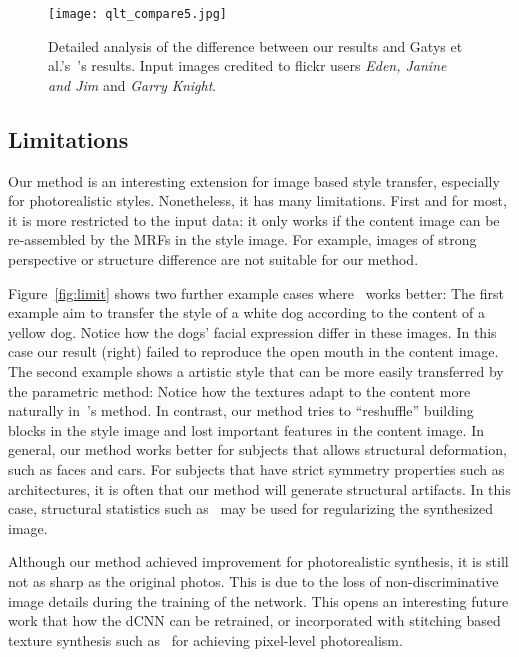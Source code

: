 \documentclass[10pt,twocolumn,letterpaper]{article}
\begin{document}
\begin{figure*}[ht]
	\centering
	\texttt{[image: qlt\_compare5.jpg]}
	\caption{Detailed analysis of the difference between our results and Gatys et al.'s~\cite{Gatys15}'s results. Input images credited to flickr users \emph{Eden, Janine and Jim} and \emph{Garry Knight}.}\label{fig:qlt_compare3}
\end{figure*}



\subsection{Limitations}
Our method is an interesting extension for image based style transfer, especially for photorealistic styles. Nonetheless, it has many limitations. First and for most, it is more restricted to the input data: it only works if the content image can be re-assembled by the MRFs in the style image. For example, images of strong perspective or structure difference are not suitable for our method. 

Figure~\ref{fig:limit} shows two further example cases where~\cite{Gatys15} works better: The first example aim to transfer the style of a white dog according to the content of a yellow dog. Notice how the dogs' facial expression differ in these images. In this case our result (right) failed to reproduce the open mouth in the content image. The second example shows a artistic style that can be more easily transferred by the parametric method: Notice how the textures adapt to the content more naturally in~\cite{Gatys15}'s method. In contrast, our method tries to ``reshuffle'' building blocks in the style image and lost important features in the content image. In general, our method works better for subjects that allows structural deformation, such as faces and cars. For subjects that have strict symmetry properties such as architectures, it is often that our method will generate structural artifacts. In this case, structural statistics such as~\cite{He12} may be used for regularizing the synthesized image.

Although our method achieved improvement for photorealistic synthesis, it is still not as sharp as the original photos. This is due to the loss of non-discriminative image details during the training of the network. This opens an interesting future work that how the dCNN can be retrained, or incorporated with stitching based texture synthesis such as~\cite{Kwatra03} for achieving pixel-level photorealism.
\end{document}
